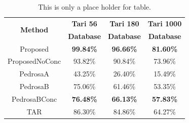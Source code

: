 \begin{table}[!h]
\caption{This is only a place holder for table.}\label{tab:accTari} \centering
\begin{tabular}{|c||c|c|c|}
  \hline
  \multirow{2}{*}{\textbf{Method}} & \textbf{Tari 56} & \textbf{Tari 180} & \textbf{Tari 1000} \\
   & \textbf{Database} & \textbf{Database} & \textbf{Database} \\
  \hline
  Proposed & \textbf{99.84\%} & \textbf{96.66\%} & \textbf{81.60\%} \\
  \hline
  ProposedNoConc & 93.82\% & 90.84\% & 73.96\% \\
  \hline
  PedrosaA \cite{Pedrosa:2011a} & 43.25\% & 26.40\% & 15.49\% \\
  \hline
  PedrosaB \cite{Pedrosa:2011b} & 75.06\% & 61.46\% & 53.35\% \\
  \hline
  PedrosaBConc & \textbf{76.48\%} & \textbf{66.13\%} & \textbf{57.83\%} \\
  \hline
  TAR & 86.30\% & 84.86\% & 64.27\% \\
  \hline
\end{tabular}
\end{table}
